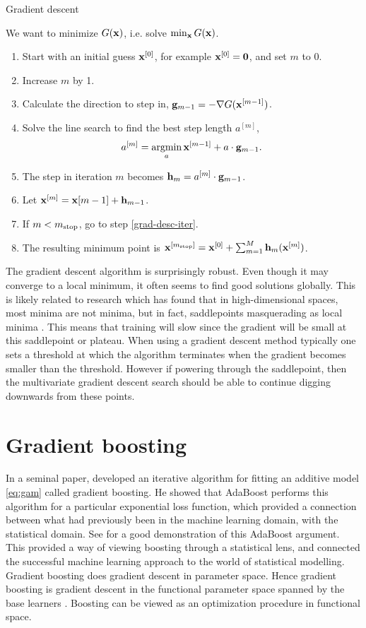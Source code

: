 \begin{algorithm}
\caption{Gradient descent}
\label{algo:grad-desc}
We want to minimize $G(\mathbf{x})$, i.e. solve $\min_{\mathbf{x}}G(\mathbf{x})$.
\begin{enumerate}
    \item Start with an initial guess $\mathbf{x}^{[0]}$, for example $\mathbf{x}^{[0]}=\mathbf{0}$, and set $m$ to 0.
    \item\label{grad-desc-iter} Increase $m$ by 1.
    \item Calculate the direction to step in, $\mathbf{g}_{m-1}=-\nabla G(\mathbf{x}^{[m-1]})$.
    \item Solve the line search to find the best step length $a^{[m]}$,
        \begin{equation*}
            a^{[m]}=\operatorname*{argmin}_{a}\mathbf{x}^{[m-1]}+a\cdot\mathbf{g}_{m-1}.
        \end{equation*}
    \item The step in iteration $m$ becomes $\mathbf{h}_m=a^{[m]}\cdot\mathbf{g}_{m-1}$.
    \item Let $\mathbf{x}^{[m]}=\mathbf{x}{[m-1]}+\mathbf{h}_{m-1}$.
    \item If $m<m_{\text{stop}}$, go to step \eqref{grad-desc-iter}.
    \item The resulting minimum point is $\mathbf{x}^{[m_{\text{stop}}]}=\mathbf{x}^{[0]}+\sum_{m=1}^M\mathbf{h}_m(\mathbf{x}^{[m]})$.
\end{enumerate}
\end{algorithm}
The gradient descent algorithm is surprisingly robust. Even though it may converge to a local minimum, it often seems to find good solutions globally. This is likely related to research which has found that in high-dimensional spaces, most minima are not minima, but in fact, saddlepoints masquerading as local minima \citep{saddlepoints}. This means that training will slow since the gradient will be small at this saddlepoint or plateau. When using a gradient descent method typically one sets a threshold at which the algorithm terminates when the gradient becomes smaller than the threshold. However if powering through the saddlepoint, then the multivariate gradient descent search should be able to continue digging downwards from these points.

\section{Gradient boosting}
In a seminal paper, \citet{friedman2001} developed an iterative algorithm for fitting an additive model \eqref{eq:gam} called gradient boosting. He showed that AdaBoost performs this algorithm for a particular exponential loss function, which provided a connection between what had previously been in the machine learning domain, with the statistical domain. See \citet{ESL} for a good demonstration of this AdaBoost argument. This provided a way of viewing boosting through a statistical lens, and connected the successful machine learning approach to the world of statistical modelling. Gradient boosting does gradient descent in parameter space. Hence gradient boosting is gradient descent in the functional parameter space spanned by the base learners \citep{friedman2001}. Boosting can be viewed as an optimization procedure in functional space.

